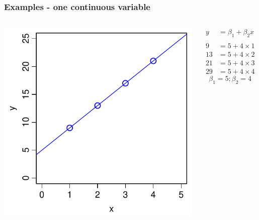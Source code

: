 \documentclass[aspectratio=43]{beamer}
\begin{document}
\frame
{\frametitle{Examples - one continuous variable}

\begin{columns}[T]

		\includegraphics[width=\textwidth]{Intercept.pdf}
		
		\begin{align*}
		  y  &= \beta_1 + \beta_2 x \\
		  \\
		  9  &= 5 + 4 \times 1 \\
		  13  &= 5 + 4 \times 2 \\
		  21 &= 5 + 4 \times 3 \\
		  29 &= 5 + 4 \times 4   
		\end{align*}
        \[\beta_1 = 5; \beta_2=4\]
\end{columns}
}
\end{document}
